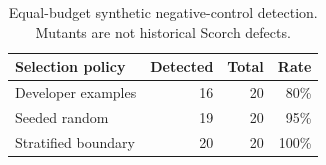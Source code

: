 \begin{table}[t]
\caption{Equal-budget synthetic negative-control detection. Mutants are not historical Scorch defects.}\label{tab:mutation}
\centering
\begin{tabular}{lrrr}
\toprule
Selection policy & Detected & Total & Rate\\\midrule
Developer examples & 16 & 20 & 80\%\\
Seeded random & 19 & 20 & 95\%\\
Stratified boundary & 20 & 20 & 100\%\\
\bottomrule
\end{tabular}
\end{table}
